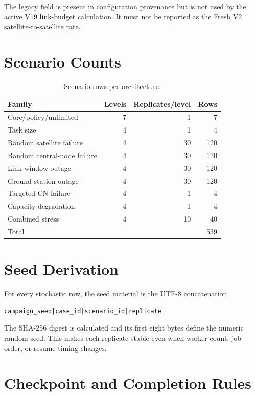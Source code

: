 The legacy field  is present in configuration provenance but is not used by the active V19 link-budget calculation. It must not be reported as the Fresh V2 satellite-to-satellite rate.

\section{Scenario Counts}

\begin{table}[htbp]
\centering
\caption{Scenario rows per architecture.}
\label{tab:scenario_counts_appendix}
\begin{tabular}{lrrr}
\toprule
Family & Levels & Replicates/level & Rows \\
\midrule
Core/policy/unlimited & 7 & 1 & 7 \\
Task size & 4 & 1 & 4 \\
Random satellite failure & 4 & 30 & 120 \\
Random central-node failure & 4 & 30 & 120 \\
Link-window outage & 4 & 30 & 120 \\
Ground-station outage & 4 & 30 & 120 \\
Targeted CN failure & 4 & 1 & 4 \\
Capacity degradation & 4 & 1 & 4 \\
Combined stress & 4 & 10 & 40 \\
\midrule
Total & & & 539 \\
\bottomrule
\end{tabular}
\end{table}

\section{Seed Derivation}

For every stochastic row, the seed material is the UTF-8 concatenation

\begin{lstlisting}
campaign_seed|case_id|scenario_id|replicate
\end{lstlisting}

The SHA-256 digest is calculated and its first eight bytes define the numeric random seed. This makes each replicate stable even when worker count, job order, or resume timing changes.

\section{Checkpoint and Completion Rules}

